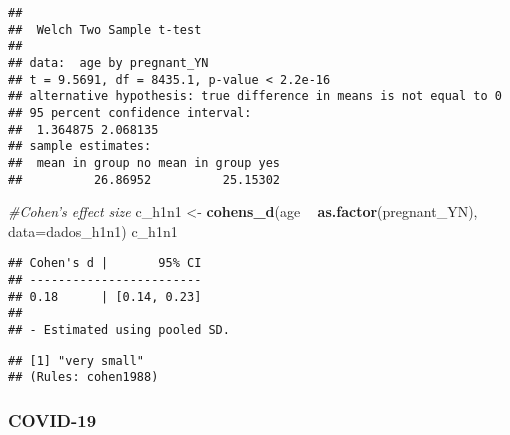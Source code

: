 \documentclass[
]{article}
\newenvironment{Shaded}{\begin{snugshade}}{\end{snugshade}}
\newcommand{\CommentTok}[1]{\textcolor[rgb]{0.56,0.35,0.01}{\textit{#1}}}
\newcommand{\DataTypeTok}[1]{\textcolor[rgb]{0.13,0.29,0.53}{#1}}
\newcommand{\KeywordTok}[1]{\textcolor[rgb]{0.13,0.29,0.53}{\textbf{#1}}}
\newcommand{\NormalTok}[1]{#1}
\newcommand{\OperatorTok}[1]{\textcolor[rgb]{0.81,0.36,0.00}{\textbf{#1}}}
\newcommand{\StringTok}[1]{\textcolor[rgb]{0.31,0.60,0.02}{#1}}
\begin{document}
\begin{verbatim}
## 
##  Welch Two Sample t-test
## 
## data:  age by pregnant_YN
## t = 9.5691, df = 8435.1, p-value < 2.2e-16
## alternative hypothesis: true difference in means is not equal to 0
## 95 percent confidence interval:
##  1.364875 2.068135
## sample estimates:
##  mean in group no mean in group yes 
##          26.86952          25.15302
\end{verbatim}

\begin{Shaded}
\begin{Highlighting}[]
\CommentTok{#Cohen's effect size}
\NormalTok{c_h1n1 <-}\StringTok{ }\KeywordTok{cohens_d}\NormalTok{(age }\OperatorTok{~}\StringTok{ }\KeywordTok{as.factor}\NormalTok{(pregnant_YN), }\DataTypeTok{data=}\NormalTok{dados_h1n1)}
\NormalTok{c_h1n1}
\end{Highlighting}
\end{Shaded}

\begin{verbatim}
## Cohen's d |       95% CI
## ------------------------
## 0.18      | [0.14, 0.23]
## 
## - Estimated using pooled SD.
\end{verbatim}

\begin{Shaded}
\end{Shaded}

\begin{verbatim}
## [1] "very small"
## (Rules: cohen1988)
\end{verbatim}

\hypertarget{covid-19}{%
\subsubsection{COVID-19}\label{covid-19}}

\begin{Shaded}
\end{Shaded}
\end{document}
